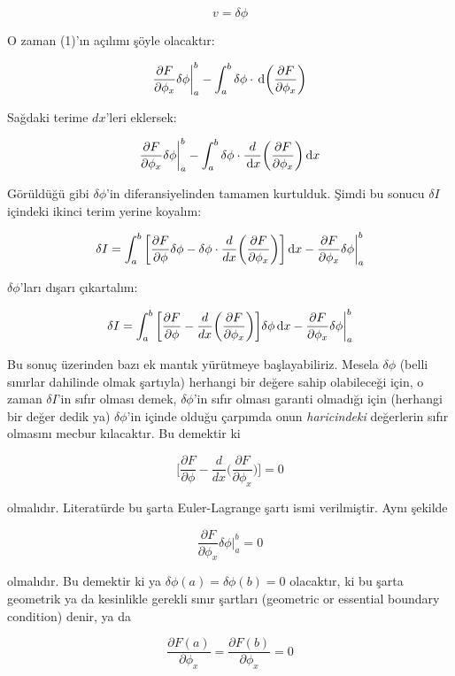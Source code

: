 \documentclass[12pt,fleqn]{article}\usepackage{../../common}
\begin{document}
$$ v  = \delta \phi $$

O zaman (1)'ın açılımı şöyle olacaktır:

$$ 
\frac{\partial F}{\partial \phi_x} \delta \phi \bigg|_a^b - 
\int_a^b \delta \phi \cdot \,\mathrm{d} \bigg( \frac{\partial F}{\partial \phi_x} \bigg)
 $$

Sağdaki terime $dx$'leri eklersek:

$$ 
\frac{\partial F}{\partial \phi_x} \delta \phi \bigg|_a^b - 
\int_a^b \delta \phi \cdot \frac{d}{\,\mathrm{d} x} \bigg( \frac{\partial F}{\partial \phi_x} \bigg) \,\mathrm{d} x
 $$

Görüldüğü gibi $\delta \phi$'in diferansiyelinden tamamen kurtulduk. Şimdi bu
sonucu $\delta I$ içindeki ikinci terim yerine koyalım:

$$ 
\delta I  = \int_{a}^{b} 
\bigg[ \frac{\partial F}{\partial \phi}\delta\phi -
\delta \phi \cdot \frac{d}{dx} \bigg( \frac{\partial F}{\partial \phi_x} \bigg)
\bigg] \,\mathrm{d} x - \frac{\partial F}{\partial \phi_x} \delta \phi \bigg|_a^b 
$$

$\delta \phi$'ları dışarı çıkartalım:

$$ 
\delta I  = \int_{a}^{b} \bigg[
\frac{\partial F}{\partial \phi} -
\frac{d}{dx} \bigg( \frac{\partial F}{\partial \phi_x} \bigg)
\bigg] \delta\phi \,\mathrm{d} x - \frac{\partial F}{\partial \phi_x} \delta \phi \bigg|_a^b 
$$

Bu sonuç üzerinden bazı ek mantık yürütmeye başlayabiliriz. Mesela $\delta \phi$
(belli sınırlar dahilinde olmak şartıyla) herhangi bir değere sahip olabileceği
için, o zaman $\delta I$'in sıfır olması demek, $\delta \phi$'in sıfır olması
garanti olmadığı için (herhangi bir değer dedik ya) $\delta \phi$'in içinde
olduğu çarpımda onun {\em haricindeki} değerlerin sıfır olmasını mecbur
kılacaktır. Bu demektir ki

$$ 
\bigg[
\frac{\partial F}{\partial \phi} -
\frac{d}{dx} \bigg( \frac{\partial F}{\partial \phi_x} \bigg)
\bigg] = 0
 $$

olmalıdır. Literatürde bu şarta Euler-Lagrange şartı ismi verilmiştir. Aynı
şekilde 

$$ \frac{\partial F}{\partial \phi_x} \delta \phi \bigg|_a^b = 0 $$

olmalıdır. Bu demektir ki ya $\delta \phi(a) = \delta \phi(b) = 0$ olacaktır, ki
bu şarta geometrik ya da kesinlikle gerekli sınır şartları (geometric or
essential boundary condition) denir, ya da

$$ \frac{\partial F(a)}{\partial \phi_x} = \frac{\partial F(b)}{\partial \phi_x} = 0 $$
\end{document}
